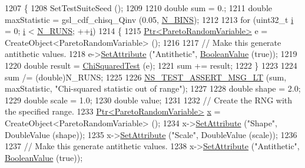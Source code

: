\begin{DoxyCode}
1207 \{
1208   SetTestSuiteSeed ();
1209 
1210   \textcolor{keywordtype}{double} sum = 0.;
1211   \textcolor{keywordtype}{double} maxStatistic = gsl\_cdf\_chisq\_Qinv (0.05, \hyperlink{classRandomVariableStreamParetoAntitheticTestCase_a558fbee3cdd5c8a42c37f41b0df83b45}{N\_BINS});
1212 
1213   \textcolor{keywordflow}{for} (uint32\_t \hyperlink{bernuolliDistribution_8m_a6f6ccfcf58b31cb6412107d9d5281426}{i} = 0; \hyperlink{bernuolliDistribution_8m_a6f6ccfcf58b31cb6412107d9d5281426}{i} < \hyperlink{classRandomVariableStreamParetoAntitheticTestCase_ae520f9d14ad8332064076ecaeb87f64a}{N\_RUNS}; ++\hyperlink{bernuolliDistribution_8m_a6f6ccfcf58b31cb6412107d9d5281426}{i})
1214     \{
1215       \hyperlink{classns3_1_1Ptr}{Ptr<ParetoRandomVariable>} e = CreateObject<ParetoRandomVariable> ();
1216 
1217       \textcolor{comment}{// Make this generate antithetic values.}
1218       e->\hyperlink{classns3_1_1ObjectBase_ac60245d3ea4123bbc9b1d391f1f6592f}{SetAttribute} (\textcolor{stringliteral}{"Antithetic"}, \hyperlink{classns3_1_1BooleanValue}{BooleanValue} (\textcolor{keyword}{true}));
1219 
1220       \textcolor{keywordtype}{double} result = \hyperlink{classRandomVariableStreamParetoAntitheticTestCase_a0c70901f3726165fa90c4500944fcfe2}{ChiSquaredTest} (e);
1221       sum += result;
1222     \}
1223 
1224   sum /= (double)N\_RUNS;
1225 
1226   \hyperlink{group__testing_ga1d96848b91407c9a0b36583e8b0ad7ae}{NS\_TEST\_ASSERT\_MSG\_LT} (sum, maxStatistic, \textcolor{stringliteral}{"Chi-squared statistic out of range"});
1227 
1228   \textcolor{keywordtype}{double} shape = 2.0;
1229   \textcolor{keywordtype}{double} scale = 1.0;
1230   \textcolor{keywordtype}{double} value;
1231 
1232   \textcolor{comment}{// Create the RNG with the specified range.}
1233   \hyperlink{classns3_1_1Ptr}{Ptr<ParetoRandomVariable>} \hyperlink{lte__link__budget__x2__handover__measures_8m_a9336ebf25087d91c818ee6e9ec29f8c1}{x} = CreateObject<ParetoRandomVariable> ();
1234   x->\hyperlink{classns3_1_1ObjectBase_ac60245d3ea4123bbc9b1d391f1f6592f}{SetAttribute} (\textcolor{stringliteral}{"Shape"}, DoubleValue (shape));
1235   x->\hyperlink{classns3_1_1ObjectBase_ac60245d3ea4123bbc9b1d391f1f6592f}{SetAttribute} (\textcolor{stringliteral}{"Scale"}, DoubleValue (scale));
1236 
1237   \textcolor{comment}{// Make this generate antithetic values.}
1238   x->\hyperlink{classns3_1_1ObjectBase_ac60245d3ea4123bbc9b1d391f1f6592f}{SetAttribute} (\textcolor{stringliteral}{"Antithetic"}, \hyperlink{classns3_1_1BooleanValue}{BooleanValue} (\textcolor{keyword}{true}));

\end{DoxyCode}
